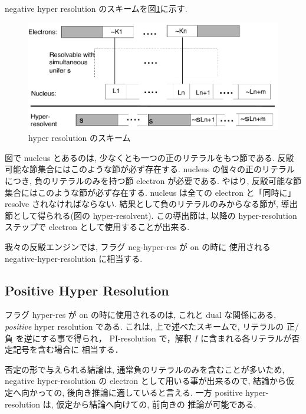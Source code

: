 negative hyper resolution のスキームを図\ref{fig:hyper-res}に示す.
\begin{figure}[htbp]
  \begin{center}
    \includegraphics[width=\textwidth]{hyper-res.pdf}
    \caption{{hyper resolution のスキーム}}
    \label{fig:hyper-res}
  \end{center}
\end{figure}

図で nucleus とあるのは, 少なくとも一つの正のリテラルをもつ節である.
反駁可能な節集合にはこのような節が必ず存在する.
nucleus の個々の正のリテラルにつき, 負のリテラルのみを持つ節 electron が必要である.
やはり, 反駁可能な節集合にはこのような節が必ず存在する.
nucleus は全ての electron と「同時に」resolve されなければならない. 
結果として負のリテラルのみからなる節が, 導出節として得られる(図の hyper-resolvent).
この導出節は, 以降の hyper-resolution ステップで electron として使用することが出来る.

我々の反駁エンジンでは, フラグ neg-hyper-res が on の時に
使用される negative-hyper-resolution に相当する.

\subsection{Positive Hyper Resolution}

フラグ hyper-res が on の時に使用されるのは, これと dual な関係にある,
\textsl{positive} hyper resolution である. 
これは, 上で述べたスキームで, リテラルの 正/負 を逆にする事で得られ，
PI-resolution で，解釈 $I$ に含まれる各リテラルが否定記号を含む場合に
相当する．

否定の形で与えられる結論は, 通常負のリテラルのみを含むことが多いため,
negative hyper-resolution の electron として用いる事が出来るので,
結論から仮定へ向かっての, 後向き推論に適していると言える.
一方 positive hyper-resolution は, 仮定から結論へ向けての, 前向きの
推論が可能である. 

